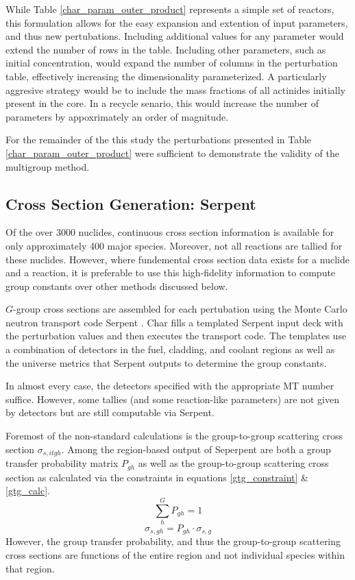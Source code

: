 While Table \ref{char_param_outer_product} represents a simple set of reactors, this formulation 
allows for the easy expansion and extention of input parameters, and thus new pertubations. 
Including additional values for any parameter would extend the number of rows in the table.  
Including other parameters, such as initial  concentration, would expand the number of
columns in the perturbation table, effectively increasing the dimensionality parameterized.
A particularly aggresive strategy would be to include the mass fractions of all actinides initially
present in the core.  In a recycle senario, this would increase the number of parameters by 
appoxrimately an order of magnitude.  

For the remainder of the this study the perturbations presented in Table \ref{char_param_outer_product}
were sufficient to demonstrate the validity of the multigroup method.

\subsection{Cross Section Generation: Serpent}
Of the over 3000 nuclides, continuous cross section information is available for only 
approximately 400 major species.  Moreover, not all reactions are tallied 
for these nuclides.  However, where fundemental cross section data exists for a nuclide
and a reaction, it is preferable to use this high-fidelity information to compute group
constants over other methods discussed below.

$G$-group cross sections are assembled for each pertubation using the Monte Carlo neutron
transport code Serpent \cite{Lepp2011}.  Char fills a templated Serpent input deck with the
perturbation values and then executes the transport code.  The templates use a combination 
of detectors in the fuel, cladding, and coolant regions as well as the universe metrics that 
Serpent outputs to determine the group constants.

In almost every case, the detectors specified with the appropriate MT number suffice.  
However, some tallies (and some reaction-like parameters) are not given by detectors
but are still computable via Serpent.

Foremost of the non-standard calculations is the group-to-group scattering cross section
$\sigma_{s,itgh}$.  Among the region-based output of Seperpent are both a group transfer
probability matrix $P_{gh}$ as well as the group-to-group scattering cross section
as calculated via the constraints in equations \ref{gtg_constraint} \& \ref{gtg_calc}.
\begin{equation}
\label{gtg_constraint}
\sum_h^G P_{gh} = 1
\end{equation}
\begin{equation}
\label{gtg_calc}
\sigma_{s,gh} = P_{gh} \cdot \sigma_{s,g}
\end{equation}
However, the group transfer probability, and thus the group-to-group scattering cross sections
are functions of the entire region and not individual species within that region.  

